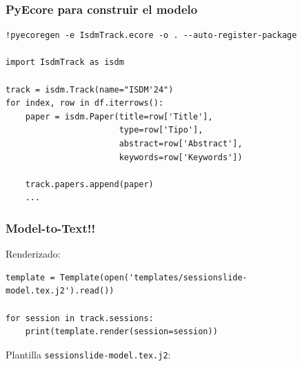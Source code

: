 \begin{frame}[fragile]
  \frametitle{PyEcore para construir el modelo}
\begin{lstlisting}[basicstyle=\large\tt]
%pip install pyecore pyecoregen
!pyecoregen -e IsdmTrack.ecore -o . --auto-register-package

import IsdmTrack as isdm

track = isdm.Track(name="ISDM'24")
for index, row in df.iterrows():
    paper = isdm.Paper(title=row['Title'],
                       type=row['Tipo'],
                       abstract=row['Abstract'],
                       keywords=row['Keywords'])

    track.papers.append(paper)
    ...
\end{lstlisting}
\end{frame}


\begin{frame}[fragile]
  \frametitle{Model-to-Text!!}
Renderizado:
\begin{lstlisting}
template = Template(open('templates/sessionslide-model.tex.j2').read())

for session in track.sessions:
    print(template.render(session=session))
\end{lstlisting}



  Plantilla {\tt sessionslide-model.tex.j2}:

\end{frame}







